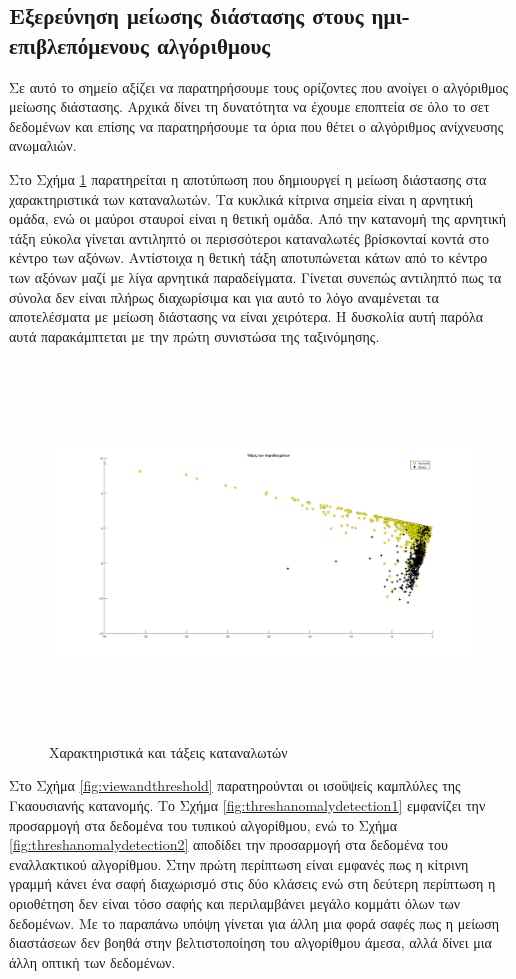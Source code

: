 \subsection{Εξερεύνηση μείωσης διάστασης στους ημι-επιβλεπόμενους αλγόριθμους}
Σε αυτό το σημείο αξίζει να παρατηρήσουμε τους ορίζοντες που ανοίγει ο αλγόριθμος μείωσης διάστασης. Αρχικά δίνει τη δυνατότητα να έχουμε εποπτεία σε όλο το σετ δεδομένων και επίσης να παρατηρήσουμε τα όρια που θέτει ο αλγόριθμος ανίχνευσης ανωμαλιών.\par
Στο Σχήμα \ref{fig:charclasscons} παρατηρείται η αποτύπωση που δημιουργεί η μείωση διάστασης στα χαρακτηριστικά των καταναλωτών. Τα κυκλικά κίτρινα σημεία είναι η αρνητική ομάδα, ενώ οι μαύροι σταυροί είναι η θετική ομάδα. Από την κατανομή της αρνητική τάξη εύκολα γίνεται αντιληπτό οι περισσότεροι καταναλωτές βρίσκονταί κοντά στο κέντρο των αξόνων. Αντίστοιχα η θετική τάξη αποτυπώνεται κάτων από το κέντρο των αξόνων μαζί με λίγα αρνητικά παραδείγματα. Γίνεται συνεπώς αντιληπτό πως τα σύνολα δεν είναι πλήρως διαχωρίσιμα και για αυτό το λόγο αναμένεται τα αποτελέσματα με μείωση διάστασης να είναι χειρότερα. Η δυσκολία αυτή παρόλα αυτά παρακάμπτεται με την πρώτη συνιστώσα της ταξινόμησης.\par
\begin{figure}[ht!]
 \includegraphics[width=160mm, height=100mm]{../../plots/gr_class_semi_sup.png}
\caption{Χαρακτηριστικά και τάξεις καταναλωτών}
\label{fig:charclasscons}
\end{figure}
\newpage
Στο Σχήμα \ref{fig:viewandthreshold} παρατηρούνται οι ισοϋψείς καμπλύλες της Γκαουσιανής κατανομής. Το Σχήμα \ref{fig:threshanomalydetection1} εμφανίζει την προσαρμογή στα δεδομένα του τυπικού αλγορίθμου, ενώ το Σχήμα \ref{fig:threshanomalydetection2} αποδίδει την προσαρμογή στα δεδομένα του εναλλακτικού αλγορίθμου. Στην πρώτη περίπτωση είναι εμφανές πως η κίτρινη γραμμή κάνει ένα σαφή διαχωρισμό στις δύο κλάσεις ενώ στη δεύτερη περίπτωση η οριοθέτηση δεν είναι τόσο σαφής και περιλαμβάνει μεγάλο κομμάτι όλων των δεδομένων. Με το παραπάνω υπόψη γίνεται για άλλη μια φορά σαφές πως η μείωση διαστάσεων δεν βοηθά στην βελτιστοποίηση του αλγορίθμου άμεσα, αλλά δίνει μια άλλη οπτική των δεδομένων.\par
